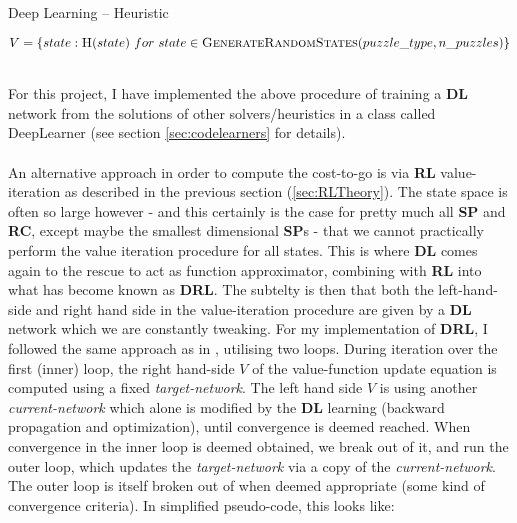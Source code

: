 \newlength\mylen
\settowidth{}
\teal
\begin{algorithm}[H]
\caption{Deep Learning -- Heuristic}\label{alg:TheoryDLDRL}
\begin{algorithmic}
 \black
{}
\State $V = \{state: \Call{H}{state} \ for \ state \in \Call{GenerateRandomStates}{puzzle\_type, n\_puzzles}\}$
\ \ \ \ 
\EndFunction
\end{algorithmic}
\end{algorithm}
\black

For this project, I have implemented the above procedure of training a \textbf{DL} network from the solutions of other solvers/heuristics in a class called DeepLearner (see section \ref{sec:codelearners} for details).
\\
\\
An alternative approach in order to compute the cost-to-go is via \textbf{RL} value-iteration as described in the previous section (\ref{sec:RLTheory}). The state space is often so large however - and this certainly is the case for pretty much all \textbf{SP} and \textbf{RC}, except maybe the smallest dimensional \textbf{SP}s - that we cannot practically perform the value iteration procedure for all states. This is where \textbf{DL} comes again to the rescue to act as function approximator, combining with \textbf{RL} into what has become known as \textbf{DRL}. The subtelty is then that both the left-hand-side and right hand side in the value-iteration procedure are given by a \textbf{DL} network which we are constantly tweaking. For my implementation of \textbf{DRL}, I followed the same approach as in \cite{Mnih2013}, utilising two loops. During iteration over the first (inner) loop, the right hand-side $V$ of the value-function update equation is computed using a fixed \textit{target-network}. The left hand side $V$ is using another \textit{current-network} which alone is modified by the \textbf{DL} learning (backward propagation and optimization), until convergence is deemed reached. When convergence in the inner loop is deemed obtained, we break out of it, and run the outer loop, which updates the \textit{target-network} via a copy of the \textit{current-network}. The outer loop is itself broken out of when deemed appropriate (some kind of convergence criteria). In simplified pseudo-code, this looks like:
\\
\\

